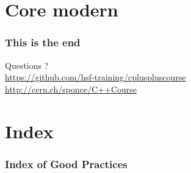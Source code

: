 \documentclass[compress]{beamer}
\begin{document}
\section[More]{Core modern \cpp}
 {












}


\begin{frame}
  \frametitle{This is the end}
  \begin{center}
    \Huge Questions ?\\
    \vspace{.5cm}
    \tiny \href{https://github.com/hsf-training/cpluspluscourse}{https://github.com/hsf-training/cpluspluscourse}\\
    \tiny \href{http://cern.ch/sponce/C++Course}{http://cern.ch/sponce/C++Course}
  \end{center}
\end{frame}

\section*{Index}

\begin{frame}
  \frametitle{Index of Good Practices}
  \listofgoodpractices
\end{frame}
\end{document}
